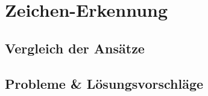 \chapter{Zeichen-Erkennung}

\section{Vergleich der Ansätze}
\section{Probleme \& Lösungsvorschläge}